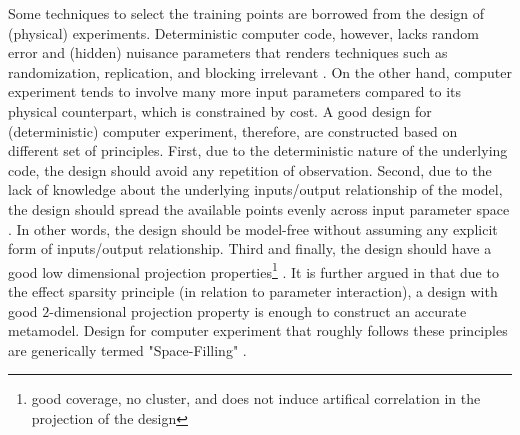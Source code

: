Some techniques to select the training points are borrowed from the design of (physical) experiments.
Deterministic computer code, however, lacks random error and (hidden) nuisance parameters that renders techniques such as randomization, replication, and blocking irrelevant \cite{Santner2003}.
On the other hand, computer experiment tends to involve many more input parameters compared to its physical counterpart, which is constrained by cost. 
A good design for (deterministic) computer experiment, therefore, are constructed based on different set of principles.
First, due to the deterministic nature of the underlying code, the design should avoid any repetition of observation. 
Second, due to the lack of knowledge about the underlying inputs/output relationship of the model, the design should spread the available points evenly across input parameter space \cite{Santner2003}.
In other words, the design should be model-free without assuming any explicit form of inputs/output relationship.
Third and finally, the design should have a good low dimensional projection properties\footnote{good coverage, no cluster, and does not induce artifical correlation in the projection of the design} \cite{Jin2003,Damblin2013}.
It is further argued in \cite{Damblin2013} that due to the effect sparsity principle (in relation to parameter interaction), 
a design with good $2$-dimensional projection property is enough to construct an accurate metamodel.   
Design for computer experiment that roughly follows these principles are generically termed "Space-Filling" \cite{Simpson2001a,Jin2003,Santner2003,Chen2006,Damblin2013}.


